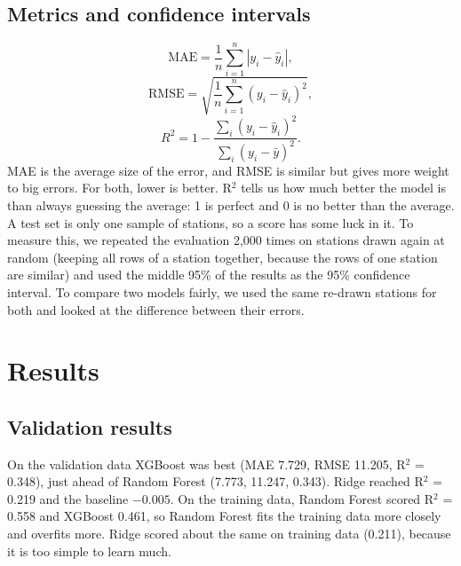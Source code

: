 \documentclass[11pt,a4paper]{article}
\begin{document}
\subsection{Metrics and confidence intervals}
\begin{equation}\mathrm{MAE}=\frac{1}{n}\sum_{i=1}^{n}|y_i-\hat{y}_i|,\end{equation}
\begin{equation}\mathrm{RMSE}=\sqrt{\frac{1}{n}\sum_{i=1}^{n}(y_i-\hat{y}_i)^2},\end{equation}
\begin{equation}R^2=1-\frac{\sum_i(y_i-\hat{y}_i)^2}{\sum_i(y_i-\bar{y})^2}.\end{equation}
MAE is the average size of the error, and RMSE is similar but gives more weight to big errors. For both, lower is better. R$^2$ tells us how much better the model is than always guessing the average: 1 is perfect and 0 is no better than the average. A test set is only one sample of stations, so a score has some luck in it. To measure this, we repeated the evaluation 2,000 times on stations drawn again at random (keeping all rows of a station together, because the rows of one station are similar) and used the middle 95\% of the results as the 95\% confidence interval. To compare two models fairly, we used the same re-drawn stations for both and looked at the difference between their errors.

\section{Results}
\subsection{Validation results}
On the validation data XGBoost was best (MAE 7.729, RMSE 11.205, R$^2$ = 0.348), just ahead of Random Forest (7.773, 11.247, 0.343). Ridge reached R$^2$ = 0.219 and the baseline $-0.005$. On the training data, Random Forest scored R$^2$ = 0.558 and XGBoost 0.461, so Random Forest fits the training data more closely and overfits more. Ridge scored about the same on training data (0.211), because it is too simple to learn much.
\end{document}
